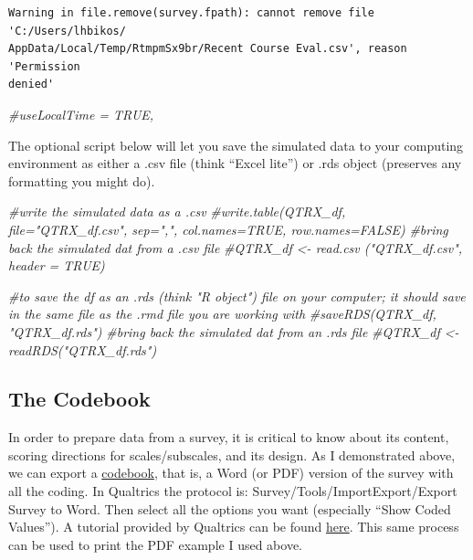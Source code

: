 \documentclass[
  english,
]{book}
\newenvironment{Shaded}{\begin{snugshade}}{\end{snugshade}}
\newcommand{\CommentTok}[1]{\textcolor[rgb]{0.56,0.35,0.01}{\textit{#1}}}
\begin{document}
\begin{verbatim}
Warning in file.remove(survey.fpath): cannot remove file 'C:/Users/lhbikos/
AppData/Local/Temp/RtmpmSx9br/Recent Course Eval.csv', reason 'Permission
denied'
\end{verbatim}

\begin{Shaded}
\begin{Highlighting}[]
\CommentTok{#useLocalTime = TRUE,}
\end{Highlighting}
\end{Shaded}

The optional script below will let you save the simulated data to your computing environment as either a .csv file (think ``Excel lite'') or .rds object (preserves any formatting you might do).

\begin{Shaded}
\begin{Highlighting}[]
\CommentTok{#write the simulated data  as a .csv}
\CommentTok{#write.table(QTRX_df, file="QTRX_df.csv", sep=",", col.names=TRUE, row.names=FALSE)}
\CommentTok{#bring back the simulated dat from a .csv file}
\CommentTok{#QTRX_df <- read.csv ("QTRX_df.csv", header = TRUE)}
\end{Highlighting}
\end{Shaded}

\begin{Shaded}
\begin{Highlighting}[]
\CommentTok{#to save the df as an .rds (think "R object") file on your computer; it should save in the same file as the .rmd file you are working with}
\CommentTok{#saveRDS(QTRX_df, "QTRX_df.rds")}
\CommentTok{#bring back the simulated dat from an .rds file}
\CommentTok{#QTRX_df <- readRDS("QTRX_df.rds")}
\end{Highlighting}
\end{Shaded}

\hypertarget{the-codebook}{%
\subsection{The Codebook}\label{the-codebook}}

In order to prepare data from a survey, it is critical to know about its content, scoring directions for scales/subscales, and its design. As I demonstrated above, we can export a \href{./Rate-a-Course_Codebook.pdf}{codebook}, that is, a Word (or PDF) version of the survey with all the coding. In Qualtrics the protocol is: Survey/Tools/ImportExport/Export Survey to Word. Then select all the options you want (especially ``Show Coded Values''). A tutorial provided by Qualtrics can be found \href{https://www.qualtrics.com/support/survey-platform/survey-module/survey-tools/import-and-export-surveys/}{here}. This same process can be used to print the PDF example I used above.
\end{document}
